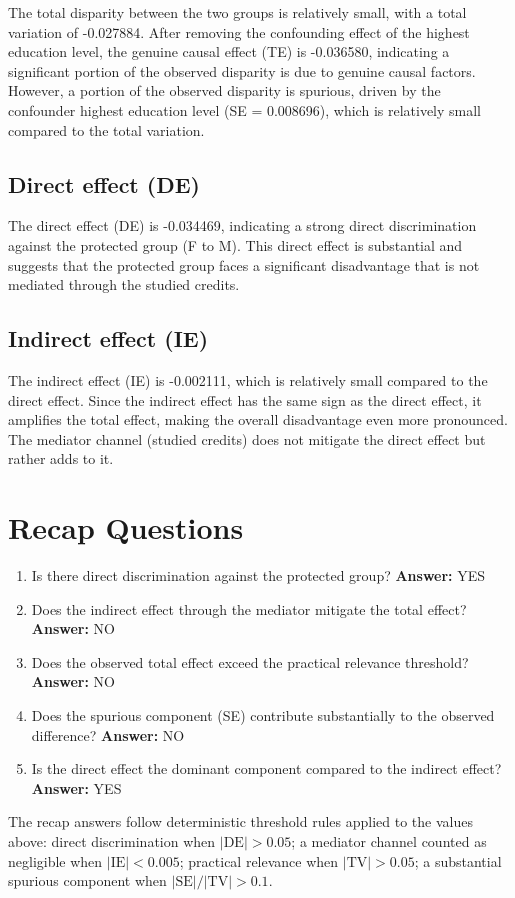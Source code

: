 \documentclass[11pt]{article}
\begin{document}
The total disparity between the two groups is relatively small, with a total variation of -0.027884. After removing the confounding effect of the highest education level, the genuine causal effect (TE) is -0.036580, indicating a significant portion of the observed disparity is due to genuine causal factors. However, a portion of the observed disparity is spurious, driven by the confounder highest education level (SE = 0.008696), which is relatively small compared to the total variation.

\subsection{Direct effect (DE)}

The direct effect (DE) is -0.034469, indicating a strong direct discrimination against the protected group (F to M). This direct effect is substantial and suggests that the protected group faces a significant disadvantage that is not mediated through the studied credits.

\subsection{Indirect effect (IE)}

The indirect effect (IE) is -0.002111, which is relatively small compared to the direct effect. Since the indirect effect has the same sign as the direct effect, it amplifies the total effect, making the overall disadvantage even more pronounced. The mediator channel (studied credits) does not mitigate the direct effect but rather adds to it.

\section{Recap Questions}

\begin{enumerate}
\item Is there direct discrimination against the protected group? \textbf{Answer:} YES
\item Does the indirect effect through the mediator mitigate the total effect? \textbf{Answer:} NO
\item Does the observed total effect exceed the practical relevance threshold? \textbf{Answer:} NO
\item Does the spurious component (SE) contribute substantially to the observed difference? \textbf{Answer:} NO
\item Is the direct effect the dominant component compared to the indirect effect? \textbf{Answer:} YES
\end{enumerate}

\vspace{1em}
\noindent\footnotesize
The recap answers follow deterministic threshold rules applied to the values above: direct discrimination when $|\mathrm{DE}| > 0.05$; a mediator channel counted as negligible when $|\mathrm{IE}| < 0.005$; practical relevance when $|\mathrm{TV}| > 0.05$; a substantial spurious component when $|\mathrm{SE}| / |\mathrm{TV}| > 0.1$.
\end{document}

